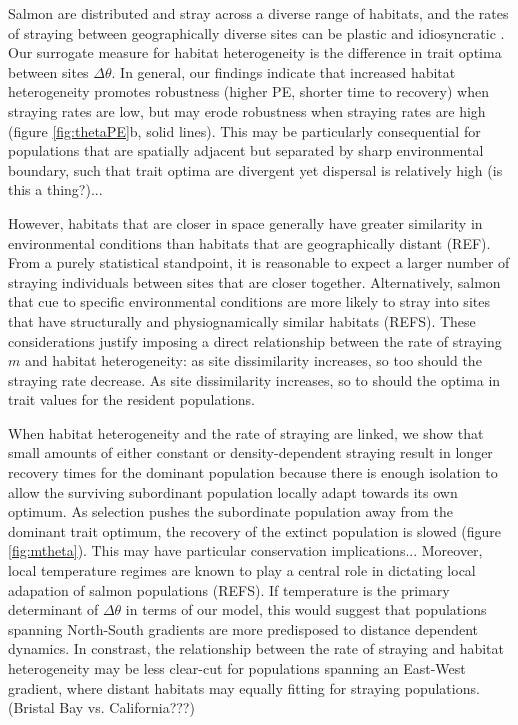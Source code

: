 \documentclass[twocolumn,preprintnumbers,amsmath,amssymb,superscriptaddress]{revtex4}
\begin{document}
Salmon are distributed and stray across a diverse range of habitats, and the rates of straying between geographically diverse sites can be plastic and idiosyncratic \cite{Westley:2015to}.
Our surrogate measure for habitat heterogeneity is the difference in trait optima between sites $\Delta\theta$.
In general, our findings indicate that increased habitat heterogeneity promotes robustness (higher PE, shorter time to recovery) when straying rates are low, but may erode robustness when straying rates are high (figure \ref{fig:thetaPE}b, solid lines).
This may be particularly consequential for populations that are spatially adjacent but separated by  sharp environmental boundary, such that trait optima are divergent yet dispersal is relatively high (is this a thing?)...

However, habitats that are closer in space generally have greater similarity in environmental conditions than habitats that are geographically distant (REF).
From a purely statistical standpoint, it is reasonable to expect a larger number of straying individuals between sites that are closer together.
Alternatively, salmon that cue to specific environmental conditions are more likely to stray into sites that have structurally and physiognamically similar habitats (REFS).
These considerations justify imposing a direct relationship between the rate of straying $m$ and habitat heterogeneity: as site dissimilarity increases, so too should the straying rate decrease.
As site dissimilarity increases, so to should the optima in trait values for the resident populations.


When habitat heterogeneity and the rate of straying are linked, we show that small amounts of either constant or density-dependent straying result in longer recovery times for the dominant population because there is enough isolation to allow the surviving subordinant population locally adapt towards its own optimum.
As selection pushes the subordinate population away from the dominant trait optimum, the recovery of the extinct population is slowed (figure \ref{fig:mtheta}).
This may have particular conservation implications...
Moreover, local temperature regimes are known to play a central role in dictating local adapation of salmon populations (REFS).
If temperature is the primary determinant of $\Delta\theta$ in terms of our model, this would suggest that populations spanning North-South gradients are more predisposed to distance dependent dynamics.
In constrast, the relationship between the rate of straying and habitat heterogeneity may be less clear-cut for populations spanning an East-West gradient, where distant habitats may equally fitting for straying populations.
(Bristal Bay vs. California???)
\end{document}
